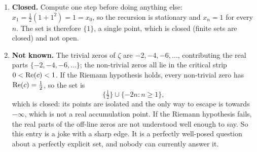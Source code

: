 \begin{exercisesolution}
\begin{enumerate}[label=\textbf{(\alph*)}]
    The lesson is that the union in \textbf{(d)} was closed-looking but glued into a half-open
    interval, whereas the union in \textbf{(e)} punctures itself at every join. Being a union
    of closed sets buys nothing; being a union of open sets buys everything.
  \item \textbf{Closed.} Compute one step before doing anything else:
    $x_1 = \tfrac12(1 + 1^2) = 1 = x_0$, so the recursion is stationary and $x_n = 1$ for every
    $n$. The set is therefore $\{1\}$, a single point, which is closed (finite sets are closed)
    and not open.
  \item \textbf{Not known.} The trivial zeros of $\zeta$ are $-2,-4,-6,\dots$, contributing
    the real parts $\{-2,-4,-6,\dots\}$; the non-trivial zeros all lie in the critical strip
    $0 < \operatorname{Re}(c) < 1$. If the Riemann hypothesis holds, every non-trivial zero has
    $\operatorname{Re}(c) = \tfrac12$, so the set is
    \[\{\tfrac12\} \cup \{-2n : n \geq 1\},\]
    which is closed: its points are isolated and the only way to escape is towards $-\infty$,
    which is not a real accumulation point. If the Riemann hypothesis fails, the real parts of
    the off-line zeros are not understood well enough to say. So this entry is a joke with a
    sharp edge. It is a perfectly well-posed question about a perfectly explicit set, and nobody
    can currently answer it.
\end{enumerate}
\end{exercisesolution}

